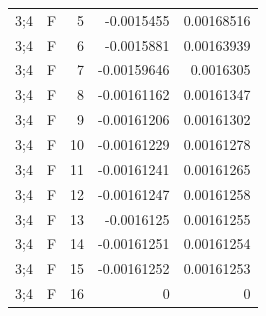 {\begin{longtable}{@{}llrrr@{}}
3;4 & F & 5 & -0.0015455 & 0.00168516 \\
3;4 & F & 6 & -0.0015881 & 0.00163939 \\
3;4 & F & 7 & -0.00159646 & 0.0016305 \\
3;4 & F & 8 & -0.00161162 & 0.00161347 \\
3;4 & F & 9 & -0.00161206 & 0.00161302 \\
3;4 & F & 10 & -0.00161229 & 0.00161278 \\
3;4 & F & 11 & -0.00161241 & 0.00161265 \\
3;4 & F & 12 & -0.00161247 & 0.00161258 \\
3;4 & F & 13 & -0.0016125 & 0.00161255 \\
3;4 & F & 14 & -0.00161251 & 0.00161254 \\
3;4 & F & 15 & -0.00161252 & 0.00161253 \\
3;4 & F & 16 & 0 & 0 \\
\end{longtable}
}
